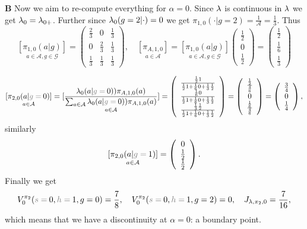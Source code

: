 \begin{example}
\vspace{1em}
\noindent{}\textbf{B}
Now we aim to re-compute everything for $\alpha = 0$. Since $\mathit{\lambda}$ is continuous in $\mathit{\lambda}$ we get
$\mathit{\lambda}_0 = \mathit{\lambda}_{0+}$. Further since $\mathit{\lambda}_0(g=2|\cdot) = 0$ we
get $\pi_{1,0}(\cdot|g=2) = \frac{1}{\mathcal{A}} = \frac{1}{3}$. Thus
$$
\underset{a\in \mathcal{A}, g \in \mathcal{G}}{[\pi_{1,0}(a|g)]} =
\left(
\begin{array}{ccc}
\frac{2}{3} &
0 &
\frac{1}{3}
\\
0 &
\frac{2}{3} &
\frac{1}{3}
\\
\frac{1}{3} &
\frac{1}{3} &
\frac{1}{3}
\end{array}
\right)
,\quad
\underset{a\in \mathcal{A}}{[\pi_{A,1,0}]}
=
\underset{a\in \mathcal{A}, g \in \mathcal{G}}{[\pi_{1,0}(a|g)]}
\left(\begin{array}{c}\frac{1}{2}\\0\\\frac{1}{2}\end{array}\right)
= 
\left(\begin{array}{c}\frac{1}{2}\\\frac{1}{6}\\\frac{1}{3}\end{array}\right)
$$



$$
\underset{a\in \mathcal{A}}{[\pi_{2,0}(a|\subnote{g=}0)]}
=
\underset{a\in \mathcal{A}} {[\frac{\tkernel_0(a|\subnote{g=}0)) 
\pi_{A,1,0}(a)}{\sum_{a\in \mathcal{A}} \tkernel_0(a|\subnote{g=}0))\pi_{A,1,0}(a)}]}
=
\left(
\begin{array}{c}
\frac{\frac{1}{2}1}{\frac{1}{2}1 + \frac{1}{6}0 + \frac{1}{3}\frac{1}{2}}
\\
\frac{\frac{1}{6}0}{\frac{1}{2}1 + \frac{1}{6}0 + \frac{1}{3}\frac{1}{2}}
\\
\frac{\frac{1}{3}\frac{1}{2}}{\frac{1}{2}1 + \frac{1}{6}0 + \frac{1}{3}\frac{1}{2}}
\end{array}
\right)
=
\left(
\begin{array}{c}
\frac{\frac{1}{2}}{\frac{4}{6}}
\\
0 
\\
\frac{\frac{1}{6}}{\frac{4}{6}}
\end{array}
\right)
=
\left(
\begin{array}{c}
\frac{3}{4}
\\
0 
\\
\frac{1}{4}
\end{array}
\right),
$$
similarly
$$
\underset{a\in \mathcal{A}}{[\pi_{2,0}(a|\subnote{g=}1)]}
=
\left(
\begin{array}{c}
0
\\
\frac{1}{2}
\\
\frac{1}{2}
\end{array}
\right)
.
$$
Finally we get
$$
V_{0}^{\pi_2}(\subnote{s=}0,\subnote{h=}1,g=0) = \frac{7}{8},\quad V_{0}^{\pi_2}(\subnote{s=}0,\subnote{h=}1,g=2) = 0,\quad
J_{\tkernel,\pi_{2},0}= \frac{7}{16}
,
$$
which means that we have a discontinuity at $\alpha = 0$: a boundary point.


\end{example}
